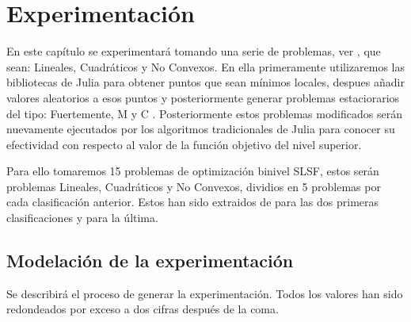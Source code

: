 \chapter{Experimentación}
En este capítulo se experimentará tomando una serie de problemas, ver \cite{BolibTestProblems}, 
que sean: Lineales, Cuadráticos y No Convexos. En ella primeramente utilizaremos las bibliotecas de Julia
para obtener puntos que sean mínimos locales, despues añadir valores aleatorios a esos puntos y posteriormente 
generar problemas estaciorarios del tipo: Fuertemente, M y C . Posteriormente estos problemas modificados serán nuevamente
ejecutados por los algoritmos tradicionales de Julia para conocer su efectividad con respecto al valor de la función objetivo del nivel superior.


Para ello tomaremos 15 problemas de optimización binivel SLSF, estos serán problemas 
Lineales, Cuadráticos y No Convexos, dividios en 5 problemas por cada clasificación anterior.
Estos han sido extraidos de \cite{Floudas1999HandbookOT} para las dos primeras clasificaciones y \cite{BolibTestProblems} para la última.

\newpage
\section{Modelación de la experimentación}
Se describirá el proceso de generar la experimentación. 
Todos los valores han sido redondeados por exceso a dos cifras después de la coma. 

